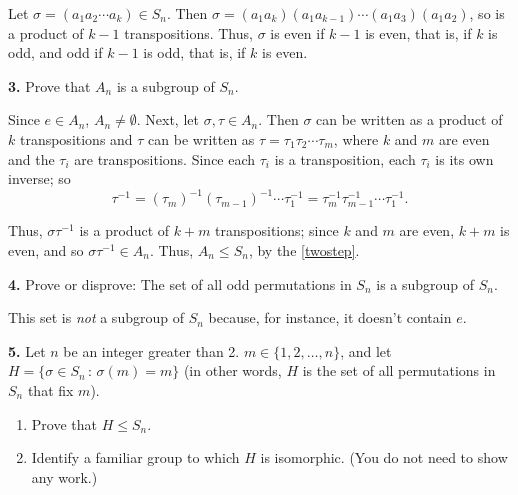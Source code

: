 \documentclass[10pt,]{book}
\theoremstyle{plain}
\theoremstyle{definition}
\theoremstyle{definition}
\theoremstyle{definition}
\theoremstyle{definition}
\numberwithin{equation}{section}
\begin{document}
      Let \(\sigma=(a_1a_2\cdots a_k)\in S_n\). Then \(\sigma=(a_1a_k)(a_1a_{k-1})\cdots (a_1a_3)(a_1a_2)\), so is a product of \(k-1\) transpositions. Thus, \(\sigma\) is even if \(k-1\) is even, that is, if \(k\) is odd, and odd if \(k-1\) is odd, that is, if \(k\) is even.
\par\smallskip
\noindent\textbf{3.}\quad{}
        Prove that \(A_n\) is a subgroup of \(S_n\).
\par\smallskip

      Since \(e\in A_n\), \(A_n\neq \emptyset\). Next, let \(\sigma, \tau \in A_n\). Then \(\sigma\) can be written as a product of \(k\) transpositions and \(\tau\) can be written as \(\tau=\tau_1\tau_2\cdots \tau_m\), where \(k\) and \(m\) are even and the \(\tau_i\) are transpositions. Since each \(\tau_i\) is a transposition, each \(\tau_i\) is its own inverse; so
\begin{equation*}

        \tau^{-1}=(\tau_m)^{-1}(\tau_{m-1})^{-1}\cdots \tau_1^{-1}=\tau_m^{-1}\tau_{m-1}^{-1}\cdots \tau_1^{-1}.
      
\end{equation*}

\par

      Thus, \(\sigma \tau^{-1}\) is a product of \(k+m\) transpositions; since \(k\) and \(m\) are even, \(k+m\) is even, and so \(\sigma \tau^{-1}\in A_n\). Thus, \(A_n\leq S_n\), by the \hyperref[twostep]{\ref{twostep}}.
\par\smallskip
\noindent\textbf{4.}\quad{}
        Prove or disprove: The set of all odd permutations in \(S_n\) is a subgroup of \(S_n\).
\par\smallskip

      This set is \emph{not} a subgroup of \(S_n\) because, for instance, it doesn't contain \(e\).
\par\smallskip
\noindent\textbf{5.}\quad{}
        Let \(n\) be an integer greater than 2. \(m \in \{1,2,\ldots,n\}\), and let \(H=\{\sigma\in S_n\,:\,\sigma(m)=m\}\) (in other words, \(H\) is the set of all permutations in \(S_n\) that fix \(m\)).
        \leavevmode%
\begin{enumerate}[label=(\alph*)]
\item\hypertarget{li-376}{}
              Prove that \(H\leq S_n\).
\item\hypertarget{li-377}{}
              Identify a familiar group to which \(H\) is isomorphic. (You do not need to show any work.)
\end{enumerate}
\end{document}
